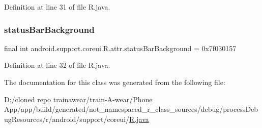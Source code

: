 Definition at line 31 of file R.\+java.

\mbox{\label{classandroid_1_1support_1_1coreui_1_1_r_1_1attr_a3bb368bee4659b4c7a943b2d3d2df47c}} 
\subsubsection{\texorpdfstring{statusBarBackground}{statusBarBackground}}
{\footnotesize\ttfamily final int android.\+support.\+coreui.\+R.\+attr.\+status\+Bar\+Background = 0x7f030157\hspace{0.3cm}{\ttfamily [static]}}



Definition at line 32 of file R.\+java.



The documentation for this class was generated from the following file\+:\begin{DoxyCompactItemize}
\item 
D\+:/cloned repo trainawear/train-\/\+A-\/wear/\+Phone App/app/build/generated/not\+\_\+namespaced\+\_\+r\+\_\+class\+\_\+sources/debug/process\+Debug\+Resources/r/android/support/coreui/\mbox{\hyperlink{process_debug_resources_2r_2android_2support_2coreui_2_r_8java}{R.\+java}}\end{DoxyCompactItemize}
